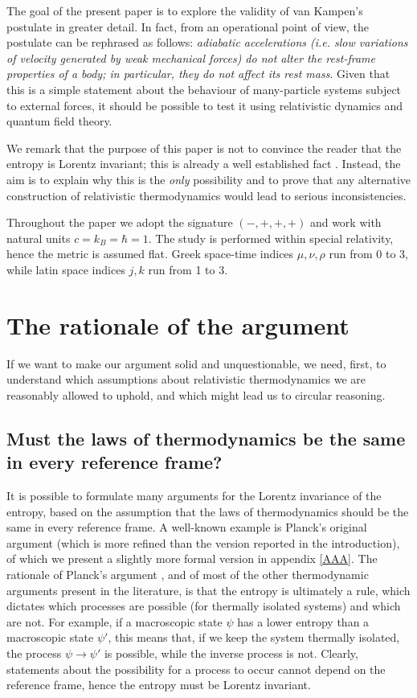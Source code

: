 \documentclass[twocolumn,usenatbib]{mnras2}
\begin{document}
The goal of the present paper is to explore the validity of van Kampen's postulate in greater detail. In fact, from an operational point of view, the postulate can be rephrased as follows: \textit{adiabatic accelerations (i.e. slow variations of velocity generated by weak mechanical forces) do not alter the rest-frame properties of a body; in particular, they do not affect its rest mass}.  Given that this is a simple statement about the behaviour of many-particle systems subject to external forces, it should be possible to test it using relativistic dynamics and quantum field theory.

We remark that the purpose of this paper is not to convince the reader that the entropy is Lorentz invariant; this is already a well established fact \citep{Israel2009_book}. Instead, the aim is to explain why this is the \textit{only} possibility and to prove that any alternative construction of relativistic thermodynamics would lead to serious inconsistencies.

Throughout the paper we adopt the signature $(-,+,+,+)$ and work with natural units $c=k_B=\hbar=1$. The study is performed within special relativity, hence the metric is assumed flat. Greek space-time indices $\mu,\nu,\rho$ run from 0 to 3, while latin space indices $j,k$ run from 1 to 3.

\section{The rationale of the argument}

If we want to make our argument solid and unquestionable, we need, first, to understand which assumptions about relativistic thermodynamics we are reasonably allowed to uphold, and which might lead us to circular reasoning.


\subsection{Must the laws of thermodynamics be the same in every reference frame?}

It is possible to formulate many arguments for the Lorentz invariance of the entropy, based on the assumption that the laws of thermodynamics should be the same in every reference frame. A well-known example is Planck's original argument (which is more refined than the version reported in the introduction), of which we present a slightly more formal version in appendix \ref{AAA}. The rationale of Planck's argument \citep{Planck_1908}, and of most of the other thermodynamic arguments present in the literature, is that the entropy is ultimately a rule, which dictates which processes are possible (for thermally isolated systems) and which are not. For example, if a macroscopic state $\psi$ has a lower entropy than a macroscopic state $\psi'$, this means that, if we keep the system thermally isolated, the process $\psi \rightarrow \psi'$ is possible, while the inverse process is not. Clearly, statements about the possibility for a process to occur cannot depend on the reference frame, hence the entropy must be Lorentz invariant.
\end{document}
